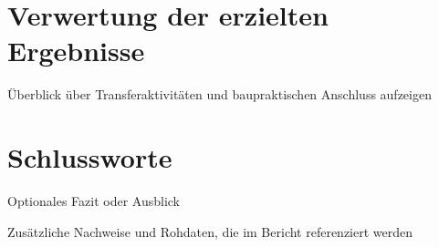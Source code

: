 \chapter{Verwertung der erzielten Ergebnisse}
Überblick über Transferaktivitäten und baupraktischen Anschluss aufzeigen

\chapter{Schlussworte}
Optionales Fazit oder Ausblick

\makeappendices
{}
Zusätzliche Nachweise und Rohdaten, die im Bericht referenziert werden

\makeregisters


